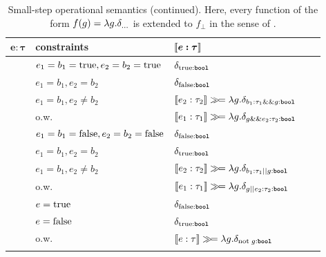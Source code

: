 \begin{table}[t]
	\allowdisplaybreaks
	\caption{Small-step operational semantics (continued). Here, every function of the form $f(g) = \lambda g. \dirac{\ldots}$ is extended to $f_{\bot}$ in the sense of .}
	\label{tab:smallstep-2}%
	\begin{center}
		\begin{adjustbox}{width=\textwidth}
		\begin{tabular}{l l l l l}
			\toprule
			\toprule
			$\mathbf{e \boldsymbol{:} \boldsymbol{\tau}}$ & \textbf{constraints}  & $\boldsymbol{\llbracket e : \tau \rrbracket}$   \\
			\hline 
			
			& $e_1 = b_1 = \textnormal{true}, e_2 = b_2 = \textnormal{true} $ & $\delta_{\textnormal{true} : \textnormal{\ttfamily\bfseries bool}}$ \\
			& $e_1 = b_1, e_2 = b_2 $ & $\delta_{\textnormal{false} : \textnormal{\ttfamily\bfseries bool}}$  \\
			&$e_1 = b_1, e_2 \neq b_2$ & $\llbracket  e_2 : \tau_2  \rrbracket \gg\!= \lambda g. \delta_{ b_1 : \tau_1 \mathrel{\&\&} g : \textnormal{\ttfamily\bfseries bool}}$ \\
			& o.w.\ & $\llbracket  e_1 : \tau_1  \rrbracket \gg\!= \lambda g. \delta_{ g \mathrel{\&\&} e_2 : \tau_2 : \textnormal{\ttfamily\bfseries bool}}$  \\
			\midrule
			
			& $e_1 = b_1 = \textnormal{false}, e_2 = b_2 = \textnormal{false} $ & $\delta_{\textnormal{false} : \textnormal{\ttfamily\bfseries bool}}$ \\
			& $e_1 = b_1, e_2 = b_2 $ & $\delta_{\textnormal{true} : \textnormal{\ttfamily\bfseries bool}}$  \\
			&$e_1 = b_1, e_2 \neq b_2$ & $\llbracket  e_2 : \tau_2  \rrbracket \gg\!= \lambda g. \delta_{ b_1 : \tau_1 \mathrel{||} g : \textnormal{\ttfamily\bfseries bool}}$ \\
			& o.w.\ & $\llbracket  e_1 : \tau_1  \rrbracket \gg\!= \lambda g. \delta_{ g \mathrel{||} e_2 : \tau_2 : \textnormal{\ttfamily\bfseries bool}}$  \\
			\midrule
			
			& $e = \textnormal{true} $ & $\delta_{\textnormal{false} : \textnormal{\ttfamily\bfseries bool}}$ \\
			& $e = \textnormal{false} $ & $\delta_{\textnormal{true} : \textnormal{\ttfamily\bfseries bool}}$  \\
			& o.w.\ & $\llbracket  e : \tau  \rrbracket \gg\!= \lambda g. \delta_{ \text{not}\; g : \textnormal{\ttfamily\bfseries bool}}$  \\
			\midrule
			

\end{tabular}
\end{adjustbox}
\end{center}
\end{table}
